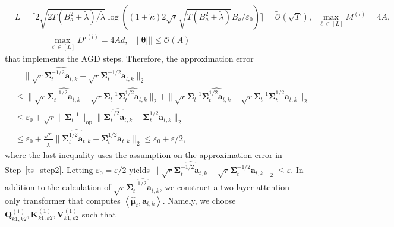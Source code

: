\documentclass[10pt]{article}
\newcommand{\eps}{\varepsilon}
\newcommand{\lops}[1]{\|{#1}\|_{\mathrm{op}}}
\renewcommand{\cO}{\mathcal{O}}
\newcommand{\<}{\left\langle}
\renewcommand{\>}{\right\rangle}
\renewcommand{\bQ}{\mathbf{Q}}
\newcommand{\nrmp}[1]{{\left|\!\left|\!\left|{#1}\right|\!\right|\!\right|}}
\newcommand{\Tpsmean}{{{\mathbf\mu}}}
\newcommand{\Tpscov}{{{\mathbf\Sigma}}}
\newcommand{\Tpsparn}{{r}}
\newcommand{\padecond}{{\tilde \kappa}}
\newcommand{\tcO}{{\tilde{\mathcal O}}}
\newcommand{\hidden}{{D'}}
\def\bK{{\mathbf K}}
\def\bQ{{\mathbf Q}}
\def\bV{{\mathbf V}}
\def\btheta{{\boldsymbol \theta}}
\def\ba{{\mathbf a}}
\begin{document}
 \begin{align*}
  &L=\lceil2\sqrt{2 T(B_a^2+\tilde\lambda)/\tilde\lambda}\log((1+\padecond)2\sqrt{\Tpsparn}\sqrt{T(B_a^2+\tilde\lambda)}B_a/\eps_0)\rceil=\tcO(\sqrt{T}),~~\max_{\ell\in[L]}M^{(l)}=4A,~~~ \\
  &\qquad\qquad
  \max_{\ell\in[L]}\hidden^{(l)}=4Ad,~~~
  \nrmp{\btheta}\leq  \cO(A)
  \end{align*} that implements the AGD steps. Therefore, the approximation error
  \begin{align*}
     &\quad\|\sqrt{\Tpsparn}\widehat{\Tpscov_t^{-1/2}\ba_{t,k}}
      -
      \sqrt{\Tpsparn}{\Tpscov_t^{-1/2}\ba_{t,k}}
      \|_2\\
      &\leq
  \|\sqrt{\Tpsparn}\widehat{\Tpscov_t^{-1/2}\ba_{t,k}} -\sqrt{\Tpsparn}\Tpscov_t^{-1}\widehat{\Tpscov_t^{1/2}\ba_{t,k}} \|_2+ \|\sqrt{\Tpsparn}\Tpscov_t^{-1}\widehat{\Tpscov_t^{1/2}\ba_{t,k}}-\sqrt{\Tpsparn}\Tpscov_t^{-1}{\Tpscov_t^{1/2}\ba_{t,k}} \|_2\\
      &\leq \eps_0+\sqrt{\Tpsparn}\lops{\Tpscov_t^{-1}}\|\widehat{\Tpscov_t^{1/2}\ba_{t,k}}-\Tpscov_t^{1/2}\ba_{t,k} \|_2\\
      &\leq
\eps_0+\frac{\sqrt{\Tpsparn}}{\tilde\lambda}\|\widehat{\Tpscov_t^{1/2}\ba_{t,k}}-\Tpscov_t^{1/2}\ba_{t,k} \|_2\leq \eps_0+\eps/2,
  \end{align*} where the last inequality uses the assumption on the approximation error in Step~\ref{ts_step2}.
  Letting  $\eps_0=\eps/2$ yields $ \|\sqrt{\Tpsparn}\widehat{\Tpscov_t^{-1/2}\ba_{t,k}}
      -
      \sqrt{\Tpsparn}{\Tpscov_t^{-1/2}\ba_{t,k}}
      \|_2\leq \eps$.
In addition to the calculation of  $\sqrt{\Tpsparn}\widehat{\Tpscov_t^{-1/2}\ba_{t,k}}$, we construct a two-layer attention-only transformer that computes $\<\widehat\Tpsmean_t,\ba_{t,k}\>$. Namely, we choose $\bQ^{(1)}_{k1,k2},\bK^{(1)}_{k1,k2},\bV^{(1)}_{k1,k2}$ such that
\end{document}
